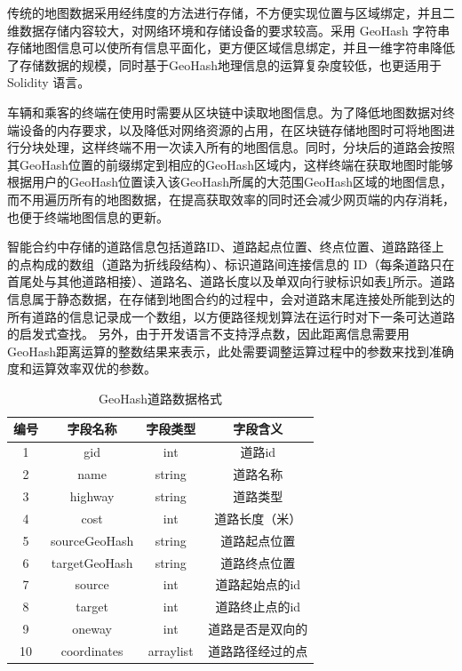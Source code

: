 传统的地图数据采用经纬度的方法进行存储，不方便实现位置与区域绑定，并且二维数据存储内容较大，对网络环境和存储设备的要求较高。采用 GeoHash 字符串存储地图信息可以使所有信息平面化，更方便区域信息绑定，并且一维字符串降低了存储数据的规模，同时基于GeoHash地理信息的运算复杂度较低，也更适用于 Solidity 语言。\par

车辆和乘客的终端在使用时需要从区块链中读取地图信息。为了降低地图数据对终端设备的内存要求，以及降低对网络资源的占用，在区块链存储地图时可将地图进行分块处理，这样终端不用一次读入所有的地图信息。同时，分块后的道路会按照其GeoHash位置的前缀绑定到相应的GeoHash区域内，这样终端在获取地图时能够根据用户的GeoHash位置读入该GeoHash所属的大范围GeoHash区域的地图信息，而不用遍历所有的地图数据，在提高获取效率的同时还会减少网页端的内存消耗，也便于终端地图信息的更新。\par

智能合约中存储的道路信息包括道路ID、道路起点位置、终点位置、道路路径上的点构成的数组（道路为折线段结构）、标识道路间连接信息的 ID（每条道路只在首尾处与其他道路相接）、道路名、道路长度以及单双向行驶标识如表\ref{tab:roadFormat}所示。道路信息属于静态数据，在存储到地图合约的过程中，会对道路末尾连接处所能到达的所有道路的信息记录成一个数组，以方便路径规划算法在运行时对下一条可达道路的启发式查找。
另外，由于开发语言不支持浮点数，因此距离信息需要用GeoHash距离运算的整数结果来表示，此处需要调整运算过程中的参数来找到准确度和运算效率双优的参数。\par

\begin{table}
  \centering
  \caption{GeoHash道路数据格式}\label{tab:roadFormat}
  \begin{tabular*}{0.9\textwidth}{@{\extracolsep{\fill}}cccc}
  \toprule
    编号    &字段名称 &字段类型 &字段含义 \\
  \midrule
    1    &gid &int &道路id\\
    2    &name &string &道路名称\\
    3    &highway &string &道路类型\\
    4    &cost &int &道路长度（米）\\
    5    &sourceGeoHash &string &道路起点位置\\
    6    &targetGeoHash &string &道路终点位置\\
    7    &source &int &道路起始点的id\\
    8    &target &int &道路终止点的id\\
    9    &oneway &int &道路是否是双向的\\
    10    &coordinates &arraylist &道路路径经过的点\\
  \bottomrule
  \end{tabular*}
\end{table}

